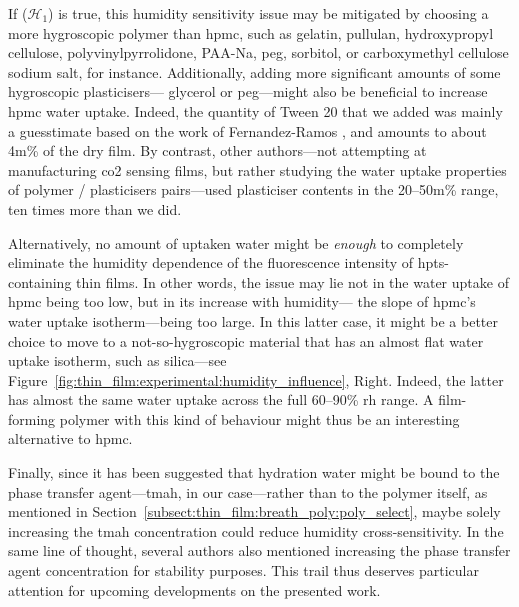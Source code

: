 If ($\mathcal{H}_1$) is true, this humidity sensitivity issue may be mitigated by choosing a more hygroscopic polymer than \gls{hpmc}, such as gelatin, pullulan\cite{yang2020capsule}, hydroxypropyl cellulose\cite{patel2022_part2}, poly\-vinyl\-pyrrolidone\cite{patel2023_part3}, PAA-Na\cite{thijs2007}, \gls{peg}, sorbitol, or carboxymethyl cellulose sodium salt\cite{callahan1982}, for instance. Additionally, adding more significant amounts of some hygroscopic plasticisers---\eg{} glycerol or \gls{peg}---might also be beneficial to increase \gls{hpmc} water uptake\cite{malik2022}. Indeed, the quantity of Tween 20 that we added was mainly a guesstimate based on the work of Fernandez-Ramos \etal{}\cite{fernandezramos2018}, and amounts to about 4m\% of the dry film. By contrast, other authors---not attempting at manufacturing \gls{co2} sensing films, but rather studying the water uptake properties of polymer / plasticisers pairs---used plasticiser contents in the 20--50m\% range\cite{suyatma2005, zeppa2009, khwaldia2013, malik2022}, \ie{} ten times more than we did.

Alternatively, no amount of uptaken water might be \emph{enough} to completely eliminate the humidity dependence of the fluorescence intensity of \gls{hpts}-containing thin films. In other words, the issue may lie not in the water uptake of \gls{hpmc} being too low, but in its increase with humidity---\ie{} the slope of \gls{hpmc}'s water uptake isotherm---being too large. In this latter case, it might be a better choice to move to a not-so-hygroscopic material that has an almost flat water uptake isotherm, such as silica---see Figure~\ref{fig:thin_film:experimental:humidity_influence}, Right. Indeed, the latter has almost the same water uptake across the full 60--90\% \gls{rh} range. A film-forming polymer with this kind of behaviour might thus be an interesting alternative to \gls{hpmc}.

Finally, since it has been suggested that hydration water might be bound to the phase transfer agent---\gls{tmah}, in our case---rather than to the polymer itself, as mentioned in Section~\ref{subsect:thin_film:breath_poly:poly_select}, maybe solely increasing the \gls{tmah} concentration could reduce humidity cross-sensitivity. In the same line of thought, several authors also mentioned increasing the phase transfer agent concentration for stability purposes\cite{neurauter1999, ge2003, cajlakovic2006, aguayolopez2014}. This \mfrin{}trail thus deserves particular attention for upcoming developments on the presented work.

